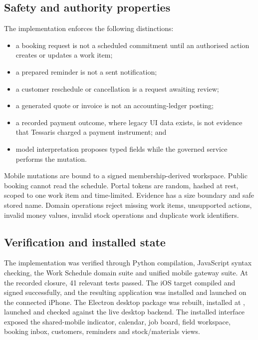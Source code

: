 \subsection{Safety and authority properties}

The implementation enforces the following distinctions:
\begin{itemize}[leftmargin=*]
  \item a booking request is not a scheduled commitment until an authorised
        action creates or updates a work item;
  \item a prepared reminder is not a sent notification;
  \item a customer reschedule or cancellation is a request awaiting review;
  \item a generated quote or invoice is not an accounting-ledger posting;
  \item a recorded payment outcome, where legacy UI data exists, is not evidence
        that Tessaris charged a payment instrument; and
  \item model interpretation proposes typed fields while the governed service
        performs the mutation.
\end{itemize}

Mobile mutations are bound to a signed membership-derived workspace.  Public
booking cannot read the schedule.  Portal tokens are random, hashed at rest,
scoped to one work item and time-limited.  Evidence has a size boundary and safe
stored name.  Domain operations reject missing work items, unsupported actions,
invalid money values, invalid stock operations and duplicate work identifiers.

\subsection{Verification and installed state}

The implementation was verified through Python compilation, JavaScript syntax
checking, the Work Schedule domain suite and unified mobile gateway suite.  At
the recorded closure, 41 relevant tests passed.  The iOS target compiled and
signed successfully, and the resulting application was installed and launched
on the connected iPhone.  The Electron desktop package was rebuilt, installed
at , launched and checked against the live
desktop backend.  The installed interface exposed the shared-mobile indicator,
calendar, job board, field workspace, booking inbox, customers, reminders and
stock/materials views.

